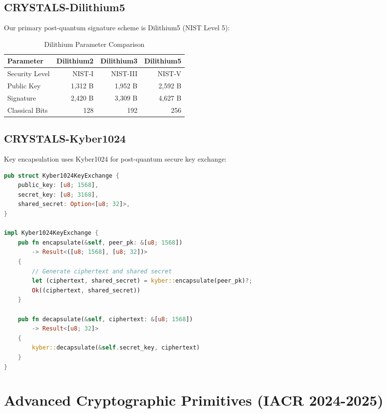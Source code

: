 \documentclass[11pt,a4paper]{article}
\begin{document}
\subsection{CRYSTALS-Dilithium5}

Our primary post-quantum signature scheme is Dilithium5 (NIST Level 5):

\begin{table}[h]
\centering
\begin{tabular}{lrrr}
\toprule
\textbf{Parameter} & \textbf{Dilithium2} & \textbf{Dilithium3} & \textbf{Dilithium5} \\
\midrule
Security Level & NIST-I & NIST-III & NIST-V \\
Public Key & 1,312 B & 1,952 B & 2,592 B \\
Signature & 2,420 B & 3,309 B & 4,627 B \\
Classical Bits & 128 & 192 & 256 \\
\bottomrule
\end{tabular}
\caption{Dilithium Parameter Comparison}
\end{table}

\subsection{CRYSTALS-Kyber1024}

Key encapsulation uses Kyber1024 for post-quantum secure key exchange:

\begin{lstlisting}[language=Rust, caption=Kyber1024 Key Exchange Implementation]
pub struct Kyber1024KeyExchange {
    public_key: [u8; 1568],
    secret_key: [u8; 3168],
    shared_secret: Option<[u8; 32]>,
}

impl Kyber1024KeyExchange {
    pub fn encapsulate(&self, peer_pk: &[u8; 1568])
        -> Result<([u8; 1568], [u8; 32])>
    {
        // Generate ciphertext and shared secret
        let (ciphertext, shared_secret) = kyber::encapsulate(peer_pk)?;
        Ok((ciphertext, shared_secret))
    }

    pub fn decapsulate(&self, ciphertext: &[u8; 1568])
        -> Result<[u8; 32]>
    {
        kyber::decapsulate(&self.secret_key, ciphertext)
    }
}
\end{lstlisting}

\section{Advanced Cryptographic Primitives (IACR 2024-2025)}
\end{document}
